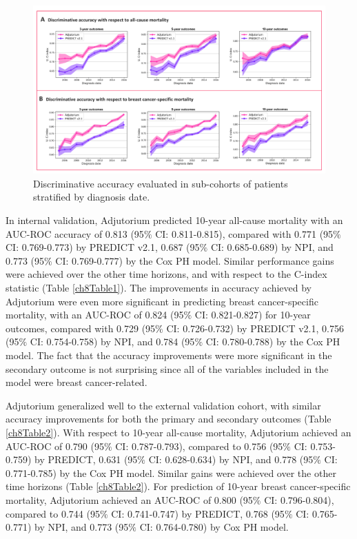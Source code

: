 \documentclass [PhD] {uclathes}
\begin{document}
\afterpage{\clearpage}
\begin{figure}
\centering
   \includegraphics[width=9in]{ch8Fig5.pdf}
    \caption{Discriminative accuracy evaluated in sub-cohorts of patients stratified by diagnosis date.}
    \label{ch8fig5}
\end{figure}

In internal validation, Adjutorium predicted 10-year all-cause mortality with an AUC-ROC accuracy of 0.813 (95$\%$ CI: 0.811-0.815), compared with 0.771 (95$\%$ CI: 0.769-0.773) by PREDICT v2.1, 0.687 (95$\%$ CI: 0.685-0.689) by NPI, and 0.773 (95$\%$ CI: 0.769-0.777) by the Cox PH model. Similar performance gains were achieved over the other time horizons, and with respect to the C-index statistic (Table \ref{ch8Table1}). The improvements in accuracy achieved by Adjutorium were even more significant in predicting breast cancer-specific mortality, with an AUC-ROC of 0.824 (95$\%$ CI: 0.821-0.827) for 10-year outcomes, compared with 0.729 (95$\%$ CI: 0.726-0.732) by PREDICT v2.1, 0.756 (95$\%$ CI: 0.754-0.758) by NPI, and 0.784 (95$\%$ CI: 0.780-0.788) by the Cox PH model. The fact that the accuracy improvements were more significant in the secondary outcome is not surprising since all of the variables included in the model were breast cancer-related.

Adjutorium generalized well to the external validation cohort, with similar accuracy improvements for both the primary and secondary outcomes (Table \ref{ch8Table2}). With respect to 10-year all-cause mortality, Adjutorium achieved an AUC-ROC of 0.790 (95$\%$ CI: 0.787-0.793), compared to 0.756 (95$\%$ CI: 0.753-0.759) by PREDICT, 0.631 (95$\%$ CI: 0.628-0.634) by NPI, and 0.778 (95$\%$ CI: 0.771-0.785) by the Cox PH model. Similar gains were achieved over the other time horizons (Table \ref{ch8Table2}). For prediction of 10-year breast cancer-specific mortality, Adjutorium achieved an AUC-ROC of 0.800 (95$\%$ CI: 0.796-0.804), compared to 0.744 (95$\%$ CI: 0.741-0.747) by PREDICT, 0.768 (95$\%$ CI: 0.765-0.771) by NPI, and 0.773 (95$\%$ CI: 0.764-0.780) by  Cox PH model.  
\end{document}
